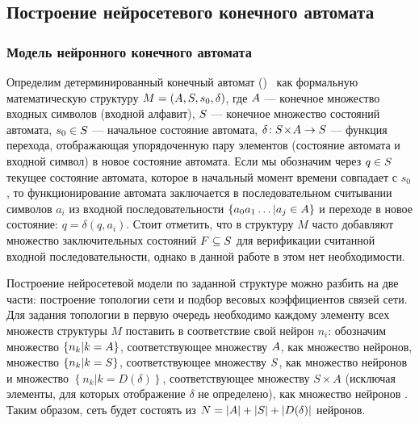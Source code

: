 \begin{figure}[ht]
    \caption{}
    \label{img:ica_modeling_result}
\end{figure}


\subsection{Построение нейросетевого конечного автомата}


\subsubsection{Модель нейронного конечного автомата}

Определим детерминированный конечный автомат ()~\cite{Hopcroft2008} как формальную математическую структуру $M = \left( A, S, s_{0}, \delta \right)$, где $A$ --- конечное множество входных символов (входной алфавит), $S$ --- конечное множество состояний автомата, $s_{0} \in S$ --- начальное состояние автомата, $\delta\!: S\!\times\!A \to S$ --- функция перехода, отображающая упорядоченную пару элементов (состояние автомата и входной символ) в новое состояние автомата. Если мы обозначим через $q \in S$ текущее состояние автомата, которое в начальный момент времени совпадает с $s_{0}$, то функционирование автомата заключается в последовательном считывании символов $a_{i}$ из входной последовательности $\left\{ a_{0} a_{1} \ldots | a_{j} \in A \right\}$ и переходе в новое состояние: $q = \delta \left( q, a_{i} \right)$. Стоит отметить, что в структуру $M$ часто добавляют множество \socalled заключительных состояний $F \subseteq S$ для верификации считанной входной последовательности, однако в данной работе в этом нет необходимости.

Построение нейросетевой модели по заданной структуре  можно разбить на две части: построение топологии сети и подбор весовых коэффициентов связей сети. Для задания топологии в первую очередь необходимо каждому элементу всех множеств структуры $M$ поставить в соответствие свой нейрон $n_{i}$: обозначим множество $\left\{ n_{k} | k = A \right\}$, соответствующее множеству $A$, как множество  нейронов, множество $\left\{ n_{k} | k = S \right\}$, соответствующее множеству $S$, как множество нейронов  и множество $\left\{ n_{k} | k = D(\delta) \right\}$, соответствующее множеству $S\!\times\!A$ (исключая элементы, для которых отображение $\delta$ не определено), как множество нейронов . Таким образом, сеть будет состоять из $N = \left|A\right| + \left|S\right| + \left|D(\delta)\right|$ нейронов.

